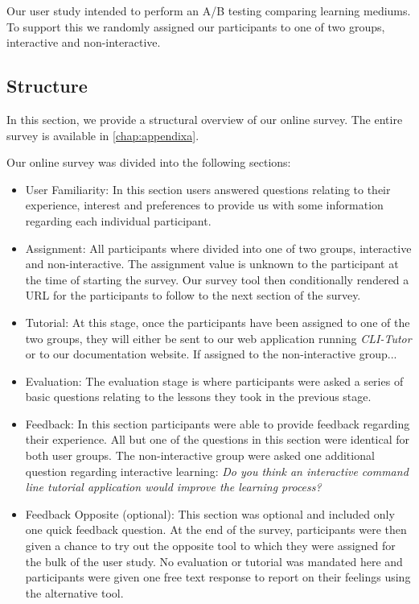 Our user study intended to perform an A/B testing comparing learning mediums.
To support this we randomly assigned our participants to one of two groups,
interactive and non-interactive. 


\subsection{Structure}

In this section, we provide a structural overview of our online survey. The
entire survey is available in \autoref{chap:appendixa}.

Our online survey was divided into the following sections:

\begin{itemize}

    \item User Familiarity: In this section users answered questions relating
        to their experience, interest and preferences to provide us with some
        information regarding each individual participant.

    \item Assignment: All participants where divided into one of two groups,
        interactive and non-interactive. The assignment value is unknown to the
        participant at the time of starting the survey. Our survey tool then
        conditionally rendered a URL for the participants to follow to the next
        section of the survey.

    \item Tutorial: At this stage, once the participants have been assigned to
        one of the two groups, they will either be sent to our web application
        running \textit{CLI-Tutor} or to our documentation website. If assigned
        to the non-interactive group...

    \item Evaluation: The evaluation stage is where participants were asked a
        series of basic questions relating to the lessons they took in the
        previous stage.

    \item Feedback: In this section participants were able to provide feedback
        regarding their experience. All but one of the questions in this
        section were identical for both user groups. The non-interactive group
        were asked one additional question regarding interactive learning: \textit{Do 
        you think an interactive command line tutorial application would
    improve the learning process?}

    \item Feedback Opposite (optional): This section was optional and included
        only one quick feedback question. At the end of the survey,
        participants were then given a chance to try out the opposite tool to
        which they were assigned for the bulk of the user study. No evaluation
        or tutorial was mandated here and participants were given one free text
        response to report on their feelings using the alternative tool.
\end{itemize}

